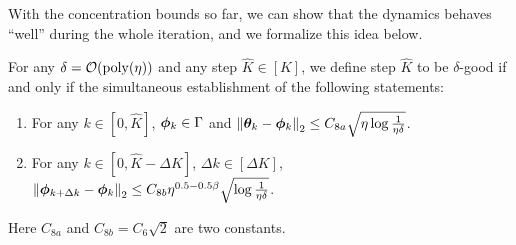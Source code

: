 
    


With the concentration bounds so far, we can show that the dynamics behaves ``well'' during the whole iteration, and we formalize this idea below.

\begin{definition}\label{def:delta-good}
    For any $\delta = \mathcal{O}(\mathrm{poly}(\eta))$ and any step $\hat{K} \in [K]$, we define step $\hat{K}$ to be $\delta$-good if and only if the simultaneous establishment of the following statements: 
    \begin{enumerate}
        \item For any $k \in [0, \hat{K}]$, ${\bm{\phi}}_k \in \Gamma$ and $\left\|{\bm{\theta}}_k - {\bm{\phi}}_k\right\|_2 \leq C_{8a}\sqrt{\eta\log\frac{1}{\eta\delta}}$.
        \item For any $k \in [0, \hat{K} - \Delta K]$, $\Delta k \in [\Delta K]$, $\left\|{\bm{\phi}}_{k+\Delta k} - {\bm{\phi}}_k\right\|_2 \leq C_{8b} \eta^{0.5-0.5\beta}\sqrt{\log \frac{1}{\eta \delta}}$.
    \end{enumerate}
    Here $C_{8a}$ and $C_{8b} = C_6\sqrt{2}$ are two constants.
\end{definition}

